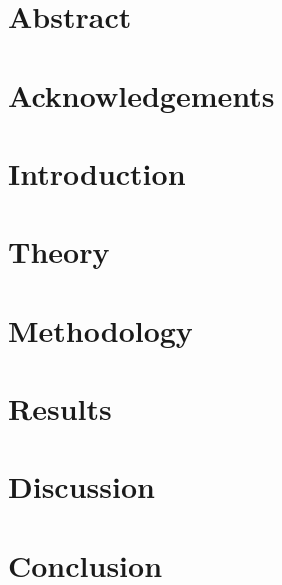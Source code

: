 \documentclass{report}
\begin{document}
\chapter*{Abstract}\label{ch:0}
\thispagestyle{empty}


\chapter*{Acknowledgements}\label{ch:acknowledegement}


\tableofcontents
\thispagestyle{empty}
\clearpage 
\setcounter{page}{1} %

\chapter{Introduction}\label{ch:intro}

%
\chapter{Theory}\label{ch:seis}


%
%
%
\chapter{Methodology}\label{ch:exp}


\chapter{Results}\label{ch:result}

%
\chapter{Discussion}\label{ch:discussion}

%
\chapter{Conclusion}\label{ch:conclusion}




\appendix


\newpage


\end{document}
